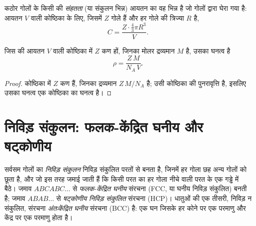 \begin{definition}[संहतता]\label{def:b1:crystals-metals:compactness}
कठोर गोलों के किसी  की \emph{संहतता} (या संकुलन भिन्न)
आयतन का वह भिन्न है जो गोलों द्वारा घेरा गया है: आयतन $V$ वाली कोष्ठिका के लिए,
जिसमें $Z$ गोले हैं और हर गोले की त्रिज्या $R$ है,
\[
  C = \frac{Z \cdot \frac43 \pi R^3}{V} .
\]
\end{definition}

\begin{proposition}[कोष्ठिका से घनत्व]\label{prop:b1:crystals-metals:density}
जिस  की आयतन $V$ वाली कोष्ठिका में $Z$
कण हों, जिनका मोलर द्रव्यमान $M$ है, उसका घनत्व है
\[
  \rho = \frac{Z\,M}{N_A\,V} .
\]
\end{proposition}

\begin{proof}
कोष्ठिका में $Z$ कण हैं, जिनका द्रव्यमान $Z\,M/N_A$ है; 
उसी कोष्ठिका की पुनरावृत्ति है, इसलिए उसका घनत्व एक कोष्ठिका का घनत्व है।
\end{proof}

\section{निविड़ संकुलन: फलक-केंद्रित घनीय और षट्कोणीय}

\begin{definition}\label{def:b1:crystals-metals:packings}
सर्वसम गोलों का \emph{निविड़ संकुलन} निविड़
संकुलित परतों से बनता है, जिनमें हर गोला छह अन्य गोलों को छूता है, और जो इस तरह जमाई जाती हैं
कि किसी परत का हर गोला नीचे वाली परत के एक गड्ढे में बैठे।
जमाव $ABCABC\dots$ से \emph{फलक-केंद्रित घनीय}
संरचना (FCC, या घनीय निविड़ संकुलित) बनती है; जमाव $ABAB\dots$
से \emph{षट्कोणीय निविड़ संकुलित}
संरचना (HCP)। धातुओं की एक तीसरी, निविड़ न संकुलित, संरचना
\emph{अंतःकेंद्रित घनीय} संरचना (BCC) है: एक
घन जिसके हर कोने पर एक परमाणु और केंद्र पर एक परमाणु होता है।
\end{definition}


